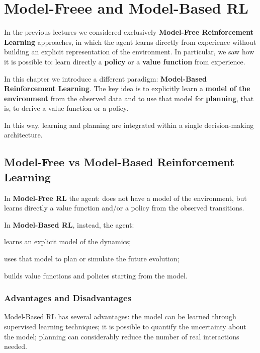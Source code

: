 \chapter{Model-Freee and Model-Based RL}

In the previous lectures we considered exclusively \textbf{Model-Free Reinforcement Learning} approaches, in which the agent learns directly from experience without building an explicit representation of the environment.
In particular, we saw how it is possible to:
learn directly a \textbf{policy} or a \textbf{value function} from experience.

In this chapter we introduce a different paradigm: \textbf{Model-Based Reinforcement Learning}.
The key idea is to explicitly learn a \textbf{model of the environment} from the observed data and to use that model for \textbf{planning}, that is, to derive a value function or a policy.

In this way, learning and planning are integrated within a single decision-making architecture.

\section{Model-Free vs Model-Based Reinforcement Learning}

In \textbf{Model-Free RL} the agent:
does not have a model of the environment,
but learns directly a value function and/or a policy from the observed transitions.

In \textbf{Model-Based RL}, instead, the agent:
\begin{compactitemize}
    \item learns an explicit model of the dynamics;
    \item uses that model to plan or simulate the future evolution;
    \item builds value functions and policies starting from the model.
\end{compactitemize}

\subsection{Advantages and Disadvantages}

Model-Based RL has several advantages:
the model can be learned through supervised learning techniques;
it is possible to quantify the uncertainty about the model;
planning can considerably reduce the number of real interactions needed.

